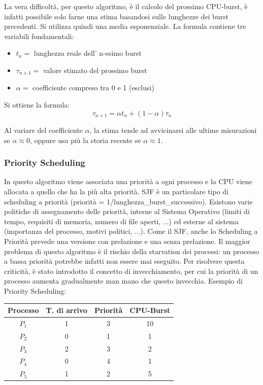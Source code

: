 \documentclass[a4paper]{article}
\begin{document}
La vera difficoltà, per questo algoritmo, è il calcolo del prossimo CPU-burst, è infatti possibile solo farne una stima basandosi sulle lunghezze dei burst precedenti. Si utilizza quindi una media esponenziale. La formula contiene tre variabili fondamentali:
\begin{itemize}
    \item $t_n =$ lunghezza reale dell' n-esimo burst
    \item $\tau_{n+1} =$ valore stimato del prossimo burst
    \item $\alpha =$ coefficiente compreso tra 0 e 1 (esclusi)
\end{itemize}

Si ottiene la formula: \newline
$$
    \tau_{n+1} = \alpha t_n + (1 - \alpha)\tau_n
$$

Al variare del coefficiente $\alpha$, la stima tende ad avvicinarsi alle ultime misurazioni se $\alpha \approx 0$, oppure usa più la storia recente se $\alpha \approx 1$.

\subsubsection{Priority Scheduling}
In questo algoritmo viene associata una priorità a ogni processo e la CPU viene allocata a quello che ha la più alta priorità. SJF è un particolare tipo di scheduling a priorità (priorità = 1/lunghezza\_burst\_successivo). \newline
Esistono varie politiche di assegnamento delle priorità, interne al Sistema Operativo (limiti di tempo, requisiti di memoria, numero di file aperti, ...) ed esterne al sistema (importanza del processo, motivi politici, ...). Come il SJF, anche lo Scheduling a Priorità prevede una versione con prelazione e una senza prelazione.\newline
Il maggior problema di questo algoritmo è il rischio della starvation dei processi: un processo a bassa priorità potrebbe infatti non essere mai eseguito. Per risolvere questa criticità, è stato introdotto il concetto di invecchiamento, per cui la priorità di un processo aumenta gradualmente man mano che questo invecchia. \newline
Esempio di Priority Scheduling:

\begin{table}[h!]
    \centering
    \label{my-label}
    \begin{tabular}{|c|c|c|c|}
        \hline
        Processo & T. di arrivo & Priorità & CPU-Burst \\ \hline
        $P_1$    & 1            & 3        & 10        \\ \hline
        $P_2$    & 0            & 1        & 1         \\ \hline
        $P_3$    & 2            & 3        & 2         \\ \hline
        $P_4$    & 0            & 4        & 1         \\ \hline
        $P_5$    & 1            & 2        & 5         \\ \hline
    \end{tabular}
\end{table}
\end{document}
